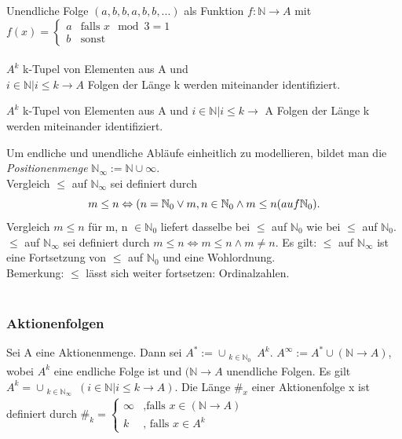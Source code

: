 Unendliche Folge $ (a, b, b, a, b, b, ...) $ als Funktion $ f: \mathbb{N} \rightarrow A $ mit $ f(x) = \begin{cases} a & \text{falls } x \mod 3 = 1\\ b & \text{sonst}\end{cases} $\\
\\
$ A^k $ k-Tupel von Elementen aus A und \\
$ {i \in \mathbb{N} | i \leq k} \rightarrow A $ Folgen der Länge k werden miteinander identifiziert.

$A^k$ k-Tupel von Elementen aus A und ${i \in \mathbb{N} | i \leq k} \rightarrow$ A Folgen der Länge k werden miteinander identifiziert.

Um endliche und unendliche Abläufe einheitlich zu modellieren, bildet man die \emph{Positionenmenge} $\mathbb{N}_\infty := \mathbb{N} \cup {\infty}$.\\
Vergleich $\leq$ auf $\mathbb{N}_\infty$ sei definiert durch
\begin{equation*}
m \leq n \Leftrightarrow (n = \mathbb{N}_0 \lor  m, n \in \mathbb{N}_0 \land m \leq n (auf \mathbb{N}_0).\\
\end{equation*}
Vergleich $m \leq n$ für m, n $\in \mathbb{N}_0$ liefert dasselbe bei $\leq$ auf $\mathbb{N}_0$ wie bei $\leq$ auf $\mathbb{N}_0$.
\\
$\le$ auf $\mathbb{N}_\infty$ sei definiert durch $m \le n \Leftrightarrow m \leq n \land m \neq n$.
Es gilt: $\le$ auf $\mathbb{N}_\infty$ ist eine Fortsetzung von $\le$ auf $\mathbb{N}_0$ und eine Wohlordnung.\\
Bemerkung: $\leq$ lässt sich weiter fortsetzen: Ordinalzahlen.\\
\\
\subsubsection*{Aktionenfolgen}
Sei A eine Aktionenmenge. Dann sei $A^* := \cup_{\substack{k \in \mathbb{N}_0}} A^k$.
$A^\infty := A^* \cup (\mathbb{N} \rightarrow A)$, wobei $A^k$ eine endliche Folge ist und $(\mathbb{N} \rightarrow A$ unendliche Folgen.
Es gilt $A^k = \cup_{\substack{k \in \mathbb{N}_\infty}} ({i \in \mathbb{N} | i \leq k} \rightarrow A)$.
Die Länge $\#_x$ einer Aktionenfolge x ist definiert durch $\#_k = \begin{cases}
\infty&\text{,falls $x \in (\mathbb{N} \rightarrow A)$}\\
k&\text{, falls $x \in A^k$}
\end{cases}$

